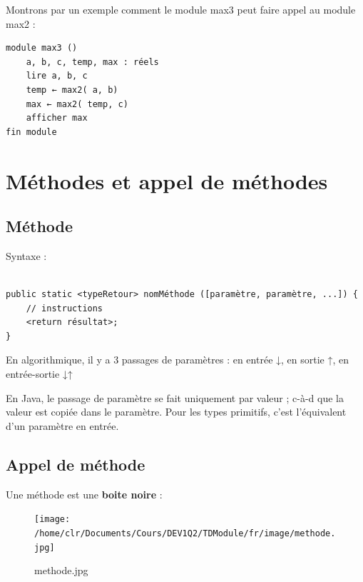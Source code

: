\documentclass[11pt,a4paper]{article}
\begin{document}
            \par
        Montrons par un exemple comment le module max3 peut faire appel au module max2 : 
            \par
        \begin{verbatim}
module max3 ()
    a, b, c, temp, max : réels
    lire a, b, c
    temp ← max2( a, b)
    max ← max2( temp, c)
    afficher max
fin module
      \end{verbatim}\section{M\'ethodes et appel de m\'ethodes}\subsection{M\'ethode}
		  Syntaxe : 
		  \begin{verbatim}

public static <typeRetour> nomMéthode ([paramètre, paramètre, ...]) {
    // instructions
    <return résultat>;
}				\end{verbatim}
        En algorithmique, il y a 3 passages de param\`etres :
        en entr\'ee ↓, en sortie ↑, en entr\'ee-sortie ↓↑
      
            \par
        
        En Java, le passage de param\`etre se fait uniquement par valeur ; 
        c-\`a-d que la valeur est copi\'ee dans le param\`etre.
        Pour les types primitifs, c'est l'\'equivalent d'un param\`etre en entr\'ee.
      
            \par
        \subsection{Appel de m\'ethode}
		    Une m\'ethode est une \textbf{boite noire} : 
		  
            \par
        \begin{figure}[hbt]
				    \begin{center}
					\texttt{[image: /home/clr/Documents/Cours/DEV1Q2/TDModule/fr/image/methode.jpg]}
						\end{center}
                
                    \caption[methode.jpg]{methode.jpg}
                \end{figure}
                    
\end{document}
